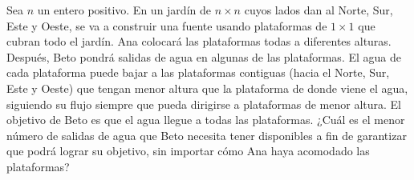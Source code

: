 Sea $n$ un entero positivo. En un jardín de $n\times n$ cuyos lados dan al Norte, Sur, Este y Oeste, se va a construir una fuente usando plataformas de $1\times 1$ que cubran todo el jardín. Ana colocará las plataformas todas a diferentes alturas. Después, Beto pondrá salidas de agua en algunas de las plataformas. El agua de cada plataforma puede bajar a las plataformas contiguas (hacia el Norte, Sur, Este y Oeste) que tengan menor altura que la plataforma de donde viene el agua, siguiendo su flujo siempre que pueda dirigirse a plataformas de menor altura. El objetivo de Beto es que el agua llegue a todas las plataformas. ¿Cuál es el menor número de salidas de agua que Beto necesita tener disponibles a fin de garantizar que podrá lograr su objetivo, sin importar cómo Ana haya acomodado las plataformas?